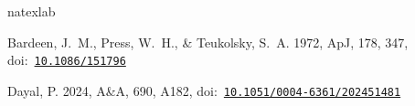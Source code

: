 \documentclass[11pt]{article}
\renewcommand{\bibinfo}[2]{}
\begin{document}
\begin{thebibliography}{}
\expandafter\ifx\csname natexlab\endcsname\relax\def\natexlab#1{#1}\fi
\providecommand{\url}[1]{\href{#1}{#1}}
\providecommand{\dodoi}[1]{doi:~\href{http://doi.org/#1}{\nolinkurl{#1}}}
\providecommand{\doeprint}[1]{\href{http://ascl.net/#1}{\nolinkurl{http://ascl.net/#1}}}
\providecommand{\doarXiv}[1]{\href{https://arxiv.org/abs/#1}{\nolinkurl{https://arxiv.org/abs/#1}}}

Bardeen, J.~M., Press, W.~H., \& Teukolsky, S.~A. 1972,
  \bibinfo{title}{Rotating Black Holes: Locally Nonrotating Frames, Energy
  Extraction, and Scalar Synchrotron Radiation,} ApJ, 178, 347,
  \dodoi{10.1086/151796}

Dayal, P. 2024, \bibinfo{title}{Exploring a primordial solution for early black
  holes detected with JWST,} A\&A, 690, A182,
  \dodoi{10.1051/0004-6361/202451481}

\end{thebibliography}
\end{document}
